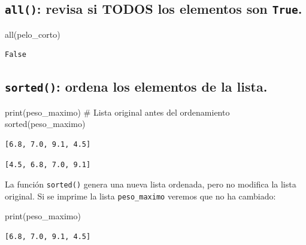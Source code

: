 \documentclass[
  spanish,
  letterpaper,
]{scrbook}
\newenvironment{Shaded}{\begin{snugshade}}{\end{snugshade}}
\newcommand{\BuiltInTok}[1]{\textcolor[rgb]{0.00,0.23,0.31}{#1}}
\newcommand{\CommentTok}[1]{\textcolor[rgb]{0.37,0.37,0.37}{#1}}
\newcommand{\NormalTok}[1]{\textcolor[rgb]{0.00,0.23,0.31}{#1}}
\theoremstyle{definition}
\theoremstyle{remark}
\begin{document}
\subsection{\texorpdfstring{\texttt{all()}: revisa si TODOS los
elementos son
\texttt{True}.}{all(): revisa si TODOS los elementos son True.}}\label{all-revisa-si-todos-los-elementos-son-true.}

\begin{Shaded}
\begin{Highlighting}[]
\BuiltInTok{all}\NormalTok{(pelo\_corto)}
\end{Highlighting}
\end{Shaded}

\begin{verbatim}
False
\end{verbatim}

\subsection{\texorpdfstring{\texttt{sorted()}: ordena los elementos de
la
lista.}{sorted(): ordena los elementos de la lista.}}\label{sorted-ordena-los-elementos-de-la-lista.}

\begin{Shaded}
\begin{Highlighting}[]
\BuiltInTok{print}\NormalTok{(peso\_maximo) }\CommentTok{\# Lista original antes del ordenamiento}
\BuiltInTok{sorted}\NormalTok{(peso\_maximo) }
\end{Highlighting}
\end{Shaded}

\begin{verbatim}
[6.8, 7.0, 9.1, 4.5]
\end{verbatim}

\begin{verbatim}
[4.5, 6.8, 7.0, 9.1]
\end{verbatim}

La función \texttt{sorted()} genera una nueva lista ordenada, pero no
modifica la lista original. Si se imprime la lista \texttt{peso\_maximo}
veremos que no ha cambiado:

\begin{Shaded}
\begin{Highlighting}[]
\BuiltInTok{print}\NormalTok{(peso\_maximo)}
\end{Highlighting}
\end{Shaded}

\begin{verbatim}
[6.8, 7.0, 9.1, 4.5]
\end{verbatim}
\end{document}
